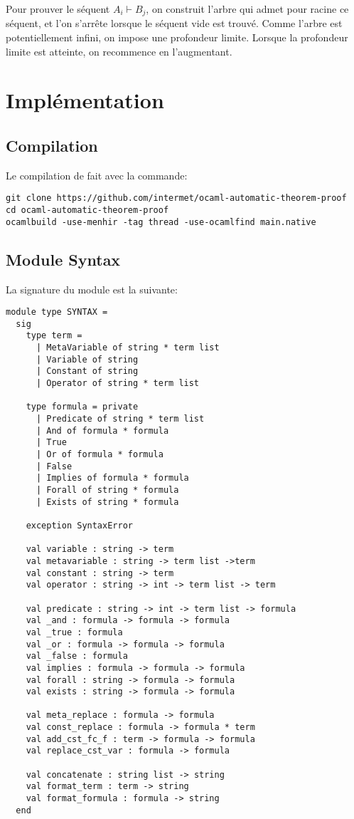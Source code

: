 \documentclass[12pt]{article}
\begin{document}
Pour prouver le séquent $A_i \vdash B_j$, on construit l'arbre qui admet pour racine ce séquent, et l'on s'arrête lorsque le séquent vide est trouvé. Comme l'arbre est potentiellement infini, on impose une profondeur limite. Lorsque la profondeur limite est atteinte, on recommence en l'augmentant.

\section{Implémentation}
\subsection*{Compilation}
Le compilation de fait avec la commande:
\begin{lstlisting}
git clone https://github.com/intermet/ocaml-automatic-theorem-proof
cd ocaml-automatic-theorem-proof
ocamlbuild -use-menhir -tag thread -use-ocamlfind main.native
\end{lstlisting}

\subsection{Module Syntax}
La signature du module est la suivante:
\begin{multicols}{2}
\begin{lstlisting}[basicstyle=\tiny]
module type SYNTAX =
  sig
    type term = 
      | MetaVariable of string * term list
      | Variable of string
      | Constant of string
      | Operator of string * term list
                  
    type formula = private 
      | Predicate of string * term list
      | And of formula * formula
      | True
      | Or of formula * formula
      | False
      | Implies of formula * formula
      | Forall of string * formula
      | Exists of string * formula

    exception SyntaxError
                
    val variable : string -> term
    val metavariable : string -> term list ->term
    val constant : string -> term
    val operator : string -> int -> term list -> term

    val predicate : string -> int -> term list -> formula
    val _and : formula -> formula -> formula
    val _true : formula
    val _or : formula -> formula -> formula
    val _false : formula
    val implies : formula -> formula -> formula
    val forall : string -> formula -> formula
    val exists : string -> formula -> formula

    val meta_replace : formula -> formula
    val const_replace : formula -> formula * term 
    val add_cst_fc_f : term -> formula -> formula
    val replace_cst_var : formula -> formula

    val concatenate : string list -> string
    val format_term : term -> string
    val format_formula : formula -> string
  end
\end{lstlisting}
\end{multicols}
\end{document}
